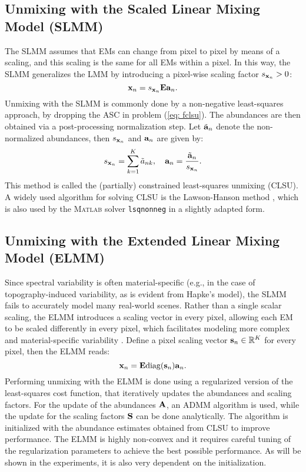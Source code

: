 \subsection{Unmixing with the Scaled Linear Mixing Model (SLMM)}
The SLMM assumes that EMs can change from pixel to pixel by means of a scaling, and this scaling is the same for all EMs within a pixel. In this way, the SLMM generalizes the LMM by introducing a pixel-wise scaling factor $s_{\mathbf{x}_n} > 0$:
\begin{equation}
    \mathbf{x}_n = s_{\mathbf{x}_n} \mathbf{E} \mathbf{a}_n.
\end{equation}
Unmixing with the SLMM is commonly done by a non-negative least-squares approach, by dropping the ASC in problem (\ref{eq: fclsu}). The abundances are then obtained via a post-processing normalization step. Let $\Tilde{\mathbf{a}}_n$ denote the non-normalized abundances, then $s_{\mathbf{x}_n}$ and $\mathbf{a}_n$  are given by:
\begin{equation}\label{eq: normalization}
            s_{\mathbf{x}_n} = \sum_{k=1}^K \Tilde{a}_{nk}, \quad \mathbf{a}_n = \frac{\Tilde{\mathbf{a}}_n}{s_{\mathbf{x}_n}}.
\end{equation}
This method is called the (partially) constrained least-squares unmixing (CLSU). A widely used algorithm for solving CLSU is the Lawson-Hanson method \cite[Ch. 23]{lawson_solving_1995}, which is also used by the \textsc{Matlab} solver \texttt{lsqnonneg} in a slightly adapted form.

\subsection{Unmixing with the Extended Linear Mixing Model (ELMM)}
Since spectral variability is often material-specific (e.g., in the case of topography-induced variability, as is evident from Hapke's model), the SLMM fails to accurately model many real-world scenes. Rather than a single scalar scaling, the ELMM introduces a scaling vector in every pixel, allowing each EM to be scaled differently in every pixel, which facilitates modeling more complex and material-specific variability \cite{drumetz_blind_2016}.  Define a pixel scaling vector $\mathbf{s}_n \in \mathbb{R}^K$ for every pixel, then the ELMM reads:
\begin{equation}
    \mathbf{x}_n = \mathbf{E} \mathrm{diag}(\mathbf{s}_n) \mathbf{a}_n.
\end{equation}
Performing unmixing with the ELMM is done using  a regularized version of the least-squares cost function, that iteratively updates the abundances and scaling factors. For the update of the abundances $\mathbf{A}$, an ADMM algorithm is used, while the update for the scaling factors $\mathbf{S}$ can be done analytically. The algorithm is initialized with the abundance estimates obtained from CLSU to improve performance. The ELMM is highly non-convex and  it requires careful tuning of the regularization parameters to achieve the best possible performance. As will be shown in the experiments, it is also very dependent on the initialization.
